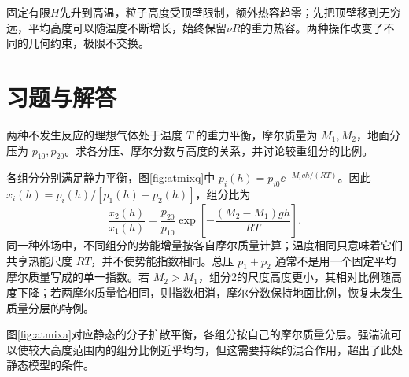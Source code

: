 \begin{solution}
固定有限$H$先升到高温，粒子高度受顶壁限制，额外热容趋零；先把顶壁移到无穷远，平均高度可以随温度不断增长，始终保留$\nu R$的重力热容。两种操作改变了不同的几何约束，极限不交换。
\end{solution}



\section{习题与解答}
\begin{exercise}[等温混合大气的组分分层]
两种不发生反应的理想气体处于温度 $T$ 的重力平衡，摩尔质量为 $M_1,M_2$，地面分压为 $p_{10},p_{20}$。求各分压、摩尔分数与高度的关系，并讨论较重组分的比例。
\end{exercise}
\begin{solution}
各组分分别满足静力平衡，图\ref{fig:atmixq}中 $p_i(h)=p_{i0}\ee^{-M_igh/(RT)}$。因此 $x_i(h)=p_i(h)/[p_1(h)+p_2(h)]$，组分比为
\[
 \frac{x_2(h)}{x_1(h)}=\frac{p_{20}}{p_{10}}
 \exp\!\left[-\frac{(M_2-M_1)gh}{RT}\right].
\]
同一种外场中，不同组分的势能增量按各自摩尔质量计算；温度相同只意味着它们共享热能尺度 $RT$，并不使势能指数相同。总压 $p_1+p_2$ 通常不是用一个固定平均摩尔质量写成的单一指数。若 $M_2>M_1$，组分2的尺度高度更小，其相对比例随高度下降；若两摩尔质量恰相同，则指数相消，摩尔分数保持地面比例，恢复未发生质量分层的特例。

图\ref{fig:atmixa}对应静态的分子扩散平衡，各组分按自己的摩尔质量分层。强湍流可以使较大高度范围内的组分比例近乎均匀，但这需要持续的混合作用，超出了此处静态模型的条件。
\end{solution}

